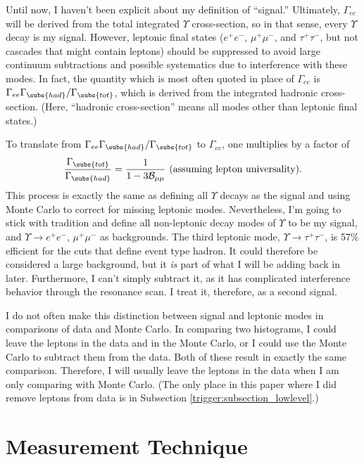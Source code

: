 Until now, I haven't been explicit about my definition of ``signal.''
Ultimately, $\Gamma_{ee}$ will be derived from the total integrated
$\Upsilon$ cross-section, so in that sense, every $\Upsilon$ decay is
my signal.  However, leptonic final states ($e^+e^-$, $\mu^+\mu^-$,
and $\tau^+\tau^-$, but not cascades that might contain leptons)
should be suppressed to avoid large continuum subtractions and
possible systematics due to interference with these modes.  In fact,
the quantity which is most often quoted in place of $\Gamma_{ee}$ is
$\Gamma_{ee}\Gamma_\subs{had}/\Gamma_\subs{tot}$, which is derived
from the integrated hadronic cross-section.  (Here, ``hadronic
cross-section'' means all modes other than leptonic final states.)

To translate from $\Gamma_{ee}\Gamma_\subs{had}/\Gamma_\subs{tot}$ to
$\Gamma_{ee}$, one multiplies by a factor of
\begin{equation}
  \frac{\Gamma_\subs{tot}}{\Gamma_\subs{had}} = \frac{1}{1 - 3
  \mathcal{B}_{\mu\mu}}  \mbox{ (assuming lepton universality).}
\end{equation}
This process is exactly the same as defining all $\Upsilon$ decays as
the signal and using Monte Carlo to correct for missing leptonic
modes.  Nevertheless, I'm going to stick with tradition and define all
non-leptonic decay modes of $\Upsilon$ to be my signal, and $\Upsilon
\to e^+e^-$, $\mu^+\mu^-$ as backgrounds.  The third leptonic mode,
$\Upsilon \to \tau^+\tau^-$, is 57\% efficient for the cuts that
define event type hadron.  It could therefore be considered a large
background, but it {\it is} part of what I will be adding back in
later.  Furthermore, I can't simply subtract it, as it has complicated
interference behavior through the resonance scan.  I treat it,
therefore, as a second signal.

I do not often make this distinction between signal and leptonic modes
in comparisons of data and Monte Carlo.  In comparing two histograms, I
could leave the leptons in the data and in the Monte Carlo, or I could
use the Monte Carlo to subtract them from the data.  Both of these
result in exactly the same comparison.  Therefore, I will usually
leave the leptons in the data when I am only comparing with Monte
Carlo.  (The only place in this paper where I did remove leptons from
data is in Subsection \ref{trigger:subsection_lowlevel}.)

\section{Measurement Technique}

